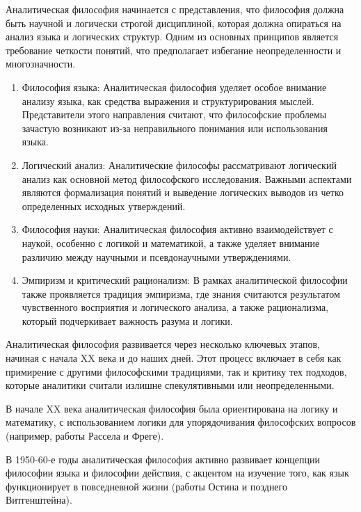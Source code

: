\documentclass[12pt,a4paper]{article}
\begin{document}
	Аналитическая философия начинается с представления, что философия должна быть научной и логически строгой дисциплиной, которая должна опираться на анализ языка и логических структур. Одним из основных принципов является требование четкости понятий, что предполагает избегание неопределенности и многозначности.
	
	\begin{enumerate}
		\item Философия языка: Аналитическая философия уделяет особое внимание анализу языка, как средства выражения и структурирования мыслей. Представители этого направления считают, что философские проблемы зачастую возникают из-за неправильного понимания или использования языка.
		
		\item Логический анализ: Аналитические философы рассматривают логический анализ как основной метод философского исследования. Важными аспектами являются формализация понятий и выведение логических выводов из четко определенных исходных утверждений.
		
		\item Философия науки: Аналитическая философия активно взаимодействует с наукой, особенно с логикой и математикой, а также уделяет внимание различию между научными и псевдонаучными утверждениями.
		
		\item Эмпиризм и критический рационализм: В рамках аналитической философии также проявляется традиция эмпиризма, где знания считаются результатом чувственного восприятия и логического анализа, а также рационализма, который подчеркивает важность разума и логики.
	\end{enumerate}
	
	Аналитическая философия развивается через несколько ключевых этапов, начиная с начала XX века и до наших дней. Этот процесс включает в себя как примирение с другими философскими традициями, так и критику тех подходов, которые аналитики считали излишне спекулятивными или неопределенными.
	
	В начале XX века аналитическая философия была ориентирована на логику и математику, с использованием логики для упорядочивания философских вопросов (например, работы Рассела и Фреге).
	
	В 1950-60-е годы аналитическая философия активно развивает концепции философии языка и философии действия, с акцентом на изучение того, как язык функционирует в повседневной жизни (работы Остина и позднего Витгенштейна).
	
\end{document}
